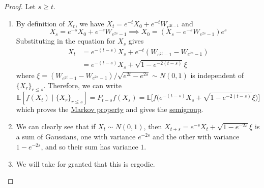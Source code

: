   \begin{proof}
  Let $s \geq t$. 
  \begin{enumerate}
      \item By definition of $X_t$, we have $X_t = e^{-t} X_0 + e^{-t} W_{e^{2t - 1}}$ and 
      \begin{equation}
        X_s = e^{-s} X_0 + e^{-s} W_{e^{2s} - 1} \implies X_0 = (X_s - e^{-s} W_{e^{2s} - 1} ) e^{s}
      \end{equation}
      Substituting in the equation for $X_s$ gives 
      \begin{align*}
          X_t & = e^{-(t - s)} X_s + e^{-t} (W_{e^{2t} - 1} - W_{e^{2s} - 1}) \\
          & = e^{-(t - s)} X_s + \sqrt{1 - e^{-2 (t - s)}} \xi
      \end{align*}
      where $\xi = (W_{e^{2t} - 1} - W_{e^{2s} - 1}) / \sqrt{e^{2t} - e^{2s}} \sim N(0, 1)$ is independent of $\{X_r\}_{r \leq s}$. Therefore, we can write 
      \begin{equation}
        \mathbb{E}[ f(X_t) \mid \{X_r\}_{r \leq s}] = P_{t - s} f (X_s) = \mathbb{E}\big[f \big( e^{-(t - s)} X_s + \sqrt{1 - e^{-2 (t - s)}} \xi \big) \big]
      \end{equation}
      which proves the \hyperref[sp-def:markov-property]{Markov property} and gives the \hyperref[alg-def:semigroup]{semigroup}. 
      
      \item We can clearly see that if $X_t \sim N(0, 1)$, then $X_{t + s} = e^{-s} X_t + \sqrt{1 - e^{-2s}}\xi$ is a sum of Gaussians, one with variance $e^{-2s}$ and the other with variance $1 - e^{-2s}$, and so their sum has variance $1$. 
      
      \item We will take for granted that this is ergodic. 
      

\end{enumerate}
\end{proof}
